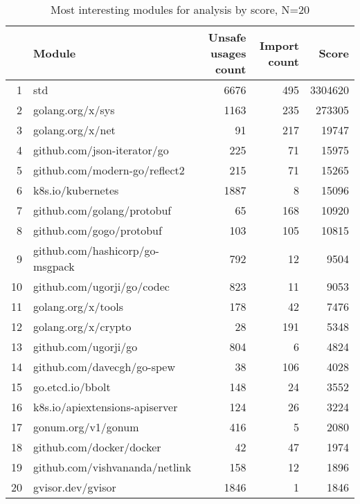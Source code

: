 \begin{table}
    \centering
    \caption{Most interesting modules for analysis by score, N=20}
    \label{tbl:most-interesting-modules-by-score}
    \begin{tabular}{rlrrr}
        \toprule
        {} &                           Module & Unsafe usages count & Import count &    Score \\
        \midrule
        1  &                              std &                6676 &          495 &  3304620 \\
        2  &                 golang.org/x/sys &                1163 &          235 &   273305 \\
        3  &                 golang.org/x/net &                  91 &          217 &    19747 \\
        4  &      github.com/json-iterator/go &                 225 &           71 &    15975 \\
        5  &    github.com/modern-go/reflect2 &                 215 &           71 &    15265 \\
        6  &                k8s.io/kubernetes &                1887 &            8 &    15096 \\
        7  &       github.com/golang/protobuf &                  65 &          168 &    10920 \\
        8  &         github.com/gogo/protobuf &                 103 &          105 &    10815 \\
        9  &  github.com/hashicorp/go-msgpack &                 792 &           12 &     9504 \\
        10 &       github.com/ugorji/go/codec &                 823 &           11 &     9053 \\
        11 &               golang.org/x/tools &                 178 &           42 &     7476 \\
        12 &              golang.org/x/crypto &                  28 &          191 &     5348 \\
        13 &             github.com/ugorji/go &                 804 &            6 &     4824 \\
        14 &       github.com/davecgh/go-spew &                  38 &          106 &     4028 \\
        15 &                 go.etcd.io/bbolt &                 148 &           24 &     3552 \\
        16 &   k8s.io/apiextensions-apiserver &                 124 &           26 &     3224 \\
        17 &               gonum.org/v1/gonum &                 416 &            5 &     2080 \\
        18 &         github.com/docker/docker &                  42 &           47 &     1974 \\
        19 &   github.com/vishvananda/netlink &                 158 &           12 &     1896 \\
        20 &                gvisor.dev/gvisor &                1846 &            1 &     1846 \\
        \bottomrule
    \end{tabular}
\end{table}

